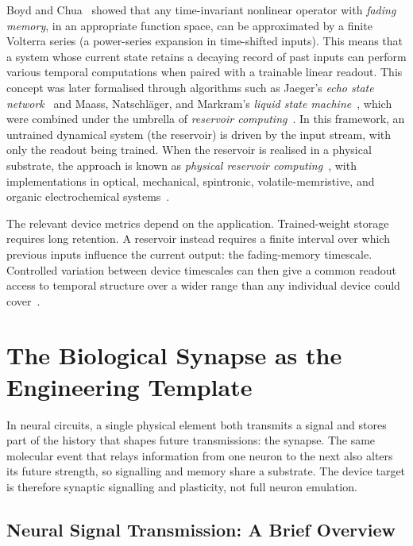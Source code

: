 \documentclass[12pt, twoside]{report}
\begin{document}
Boyd and Chua~\cite{BoydChua1985} showed that any time-invariant nonlinear operator with \textit{fading memory}, in an appropriate function space, can be approximated by a finite Volterra series (a power-series expansion in time-shifted inputs). This means that a system whose current state retains a decaying record of past inputs can perform various temporal computations when paired with a trainable linear readout. This concept was later formalised through algorithms such as Jaeger's \textit{echo state network}~\cite{Jaeger2001ESN, JaegerHaas2004} and Maass, Natschläger, and Markram's \textit{liquid state machine}~\cite{Maass2002LSM}, which were combined under the umbrella of \textit{reservoir computing}~\cite{LukoseviciusJaeger2009, Verstraeten2007}. In this framework, an untrained dynamical system (the reservoir) is driven by the input stream, with only the readout being trained. When the reservoir is realised in a physical substrate, the approach is known as \textit{physical reservoir computing}~\cite{Tanaka2019}, with implementations in optical, mechanical, spintronic, volatile-memristive, and organic electrochemical systems~\cite{Du2017, Midya2019, Zhong2021, Cucchi2021}.

The relevant device metrics depend on the application. Trained-weight storage requires long retention. A reservoir instead requires a finite interval over which previous inputs influence the current output: the fading-memory timescale. Controlled variation between device timescales can then give a common readout access to temporal structure over a wider range than any individual device could cover~\cite{Tanaka2019}.

\section{The Biological Synapse as the Engineering Template}\label{sec:bio_synapse}

In neural circuits, a single physical element both transmits a signal and stores part of the history that shapes future transmissions: the synapse. The same molecular event that relays information from one neuron to the next also alters its future strength, so signalling and memory share a substrate. The device target is therefore synaptic signalling and plasticity, not full neuron emulation.

\subsection{Neural Signal Transmission: A Brief Overview}\label{subsec:neural_signal}
\end{document}

